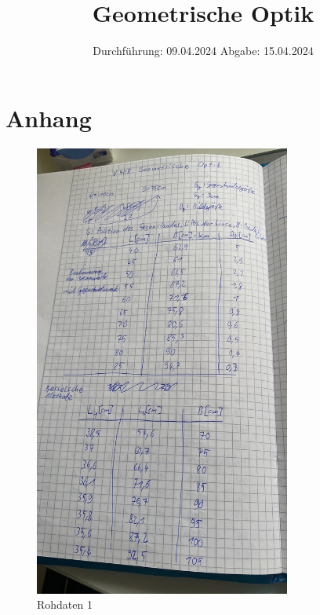 

\subject{V408}
\title{Geometrische Optik}
\date{%
  Durchführung: 09.04.2024
  \hspace{3em}
  Abgabe: 15.04.2024
}



\maketitle
\thispagestyle{empty}
\tableofcontents
\newpage







\printbibliography{}

\section{Anhang}

\begin{figure}[H]
  \includegraphics[width=\textwidth, height=15cm, angle=270]{Bilder/Messdaten1.JPG}
  \caption{Rohdaten 1}
\end{figure}

